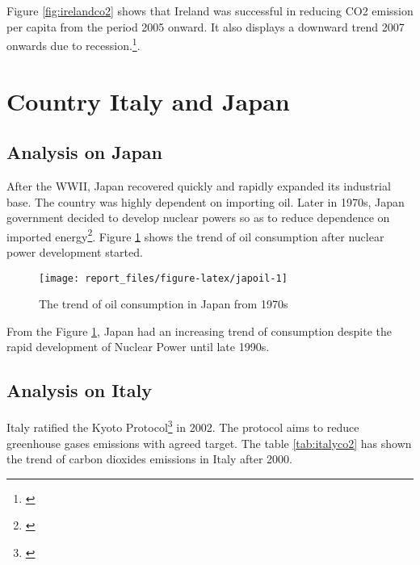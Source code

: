 \documentclass[11pt,a4paper,]{article}
\begin{document}
Figure \ref{fig:irelandco2} shows that Ireland was successful in reducing CO2 emission per capita from the period 2005 onward. It also displays a downward trend 2007 onwards due to recession.\footnote{\textcite{ireland1}}.

\section*{Country Italy and Japan}

\subsection*{Analysis on Japan}

After the WWII, Japan recovered quickly and rapidly expanded its industrial base. The country was highly dependent on importing oil. Later in 1970s, Japan government decided to develop nuclear powers so as to reduce dependence on imported energy\footnote{\textcite{japan}}. Figure \ref{fig:japoil} shows the trend of oil consumption after nuclear power development started.

\begin{figure}[H]
\texttt{[image: report\_files/figure-latex/japoil-1]} \caption{The trend of oil consumption in Japan from 1970s}\label{fig:japoil}
\end{figure}

From the Figure \ref{fig:japoil}, Japan had an increasing trend of consumption despite the rapid development of Nuclear Power until late 1990s.

\subsection*{Analysis on Italy}

Italy ratified the Kyoto Protocol\footnote{\textcite{kyoto}} in 2002. The protocol aims to reduce greenhouse gases emissions with agreed target. The table \ref{tab:italyco2} has shown the trend of carbon dioxides emissions in Italy after 2000.
\end{document}
